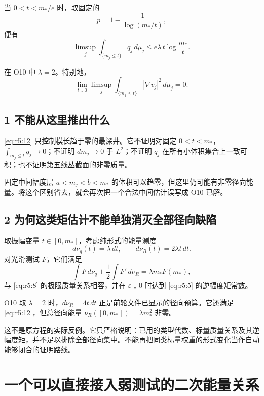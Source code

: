 \documentclass[UTF8,11pt,openany,oneside,fontset=none]{ctexbook}
\begin{document}
当 \(0<t<m_*/e\) 时，取固定的 \[
 p=1-\frac1{\log(m_*/t)},
\] 便有 \[
 \boxed{
 \limsup_j\int_{\{m_j\le t\}}q_j\,d\mu_j
 \le e\lambda\,t\log\frac{m_*}{t}.
 }
\tag{5.11}\label{eq:r5:11}
\]

在 O10 中 \(\lambda=2\)。特别地， \[
 \lim_{t\downarrow0}\limsup_j
 \int_{\{m_j\le t\}}|\nabla v_j|^2\,d\mu_j=0.
\tag{5.12}\label{eq:r5:12}
\]

\subsection{1 不能从这里推出什么}\label{ch5:ux4e0dux80fdux4eceux8fd9ux91ccux63a8ux51faux4ec0ux4e48}

\eqref{eq:r5:12} 只控制模长趋于零的最深井。它不证明对固定 \(0<t<m_*\)，\(\int_{m_j\le t}q_j\to0\)；不证明 \(dm_j\to0\) 于 \(L^2\)；不证明 \(q_j\) 在所有小体积集合上一致可积；也不证明第五线丛截面的非零质量。

固定中间幅度层 \(a<m_j<b<m_*\) 的体积可以趋零，但这里仍可能有非零径向能量。将这个区别省去，就会再次把一个合法中间估计误写成 O10 已解。

\subsection{2 为何这类矩估计不能单独消灭全部径向缺陷}\label{ch5:ux4e3aux4f55ux8fd9ux7c7bux77e9ux4f30ux8ba1ux4e0dux80fdux5355ux72ecux6d88ux706dux5168ux90e8ux5f84ux5411ux7f3aux9677}

取振幅变量 \(t\in[0,m_*]\)，考虑纯形式的能量测度 \[
 d\nu_q(t)=\lambda\,dt,\qquad d\nu_R(t)=2\lambda t\,dt.
\tag{5.13}\label{eq:r5:13}
\] 对光滑测试 \(F\)，它们满足 \[
 \int F\,d\nu_q+\frac12\int F'\,d\nu_R
 =\lambda m_* F(m_*),
\] 与 \eqref{eq:r5:8} 的极限质量关系相容，并在 \(\varepsilon\downarrow0\) 时达到 \eqref{eq:r5:5} 的逆幅度矩常数。

O10 取 \(\lambda=2\) 时，\(d\nu_R=4t\,dt\) 正是前轮文件已显示的径向预算。它还满足 \eqref{eq:r5:12}，但总径向能量 \(\nu_R([0,m_*])=\lambda m_*^2\) 非零。

这不是原方程的实际反例。它只严格说明：已用的类型代数、标量质量关系及其逆幅度矩，并不足以排除全部径向集中。不能再把同类标量权重的形式变化当作自动能够闭合的证明路线。

\section{一个可以直接接入弱测试的二次能量关系}\label{ch5:ux4e00ux4e2aux53efux4ee5ux76f4ux63a5ux63a5ux5165ux5f31ux6d4bux8bd5ux7684ux4e8cux6b21ux80fdux91cfux5173ux7cfb}
\end{document}
